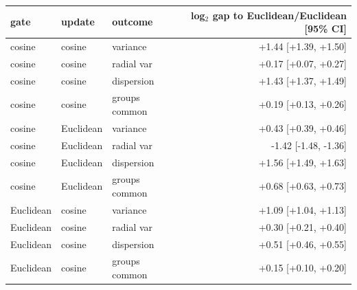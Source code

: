 \begin{tabular}{lllr}
\toprule
gate & update & outcome & log$_2$ gap to Euclidean/Euclidean [95\% CI] \\
\midrule
cosine & cosine & variance & +1.44 [+1.39, +1.50] \\
cosine & cosine & radial var & +0.17 [+0.07, +0.27] \\
cosine & cosine & dispersion & +1.43 [+1.37, +1.49] \\
cosine & cosine & groups common & +0.19 [+0.13, +0.26] \\
cosine & Euclidean & variance & +0.43 [+0.39, +0.46] \\
cosine & Euclidean & radial var & -1.42 [-1.48, -1.36] \\
cosine & Euclidean & dispersion & +1.56 [+1.49, +1.63] \\
cosine & Euclidean & groups common & +0.68 [+0.63, +0.73] \\
Euclidean & cosine & variance & +1.09 [+1.04, +1.13] \\
Euclidean & cosine & radial var & +0.30 [+0.21, +0.40] \\
Euclidean & cosine & dispersion & +0.51 [+0.46, +0.55] \\
Euclidean & cosine & groups common & +0.15 [+0.10, +0.20] \\
\bottomrule
\end{tabular}
